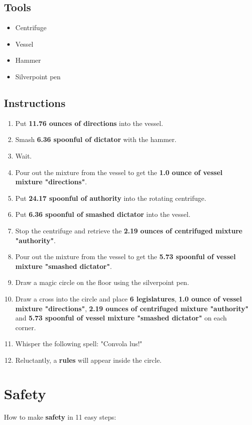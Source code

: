 \documentclass{article}
\begin{document}
\subsection{Tools}\begin{itemize}
\item 
Centrifuge
\item 
Vessel
\item 
Hammer
\item 
Silverpoint pen
\end{itemize}
\subsection{Instructions}\begin{enumerate}
\item 
Put \textbf{11.76 ounces of directions} into the vessel.
\item 
Smash \textbf{6.36 spoonful of dictator} with the hammer.
\item 
Wait.
\item 
Pour out the mixture from the vessel to get the \textbf{1.0 ounce of vessel mixture "directions"}.
\item 
Put \textbf{24.17 spoonful of authority} into the rotating centrifuge.
\item 
Put \textbf{6.36 spoonful of smashed dictator} into the vessel.
\item 
Stop the centrifuge and retrieve the \textbf{2.19 ounces of centrifuged mixture "authority"}.
\item 
Pour out the mixture from the vessel to get the \textbf{5.73 spoonful of vessel mixture "smashed dictator"}.
\item 
Draw a magic circle on the floor using the silverpoint pen.
\item 
Draw a cross into the circle and place \textbf{6 legislatures}, \textbf{1.0 ounce of vessel mixture "directions"}, \textbf{2.19 ounces of centrifuged mixture "authority"} and \textbf{5.73 spoonful of vessel mixture "smashed dictator"} on each corner.
\item 
Whisper the following spell: "Convola lus!"
\item 
Reluctantly, a \textbf{rules} will appear inside the circle.
\end{enumerate}
\newpage
\section{Safety}How to make \textbf{safety} in 11 easy steps:
\end{document}
